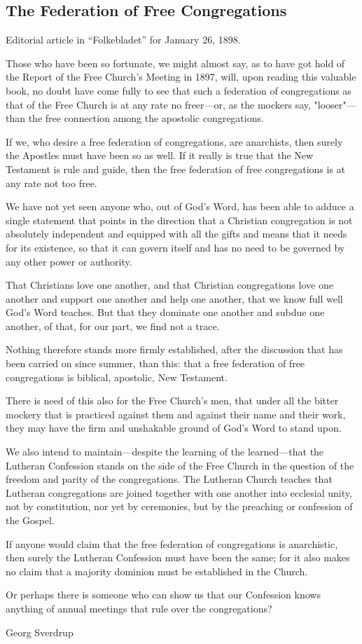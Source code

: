 
\subsection{The Federation of Free Congregations}

Editorial article in “Folkebladet” for January 26, 1898.

Those who have been so fortunate, we might almost say, as to have got hold of the Report of the Free Church’s Meeting in 1897, will, upon reading this valuable book, no doubt have come fully to see that such a federation of congregations as that of the Free Church is at any rate no freer—or, as the mockers say, "looser"—than the free connection among the apostolic congregations.

If we, who desire a free federation of congregations, are anarchists, then surely the Apostles must have been so as well. If it really is true that the New Testament is rule and guide, then the free federation of free congregations is at any rate not too free.

We have not yet seen anyone who, out of God’s Word, has been able to adduce a single statement that points in the direction that a Christian congregation is not absolutely independent and equipped with all the gifts and means that it needs for its existence, so that it can govern itself and has no need to be governed by any other power or authority.

That Christians love one another, and that Christian congregations love one another and support one another and help one another, that we know full well God’s Word teaches. But that they dominate one another and subdue one another, of that, for our part, we find not a trace.

Nothing therefore stands more firmly established, after the discussion that has been carried on since summer, than this: that a free federation of free congregations is biblical, apostolic, New Testament.

There is need of this also for the Free Church’s men, that under all the bitter mockery that is practiced against them and against their name and their work, they may have the firm and unshakable ground of God’s Word to stand upon.

We also intend to maintain—despite the learning of the learned—that the Lutheran Confession stands on the side of the Free Church in the question of the freedom and parity of the congregations. The Lutheran Church teaches that Lutheran congregations are joined together with one another into ecclesial unity, not by constitution, nor yet by ceremonies, but by the preaching or confession of the Gospel.

If anyone would claim that the free federation of congregations is anarchistic, then surely the Lutheran Confession must have been the same; for it also makes no claim that a majority dominion must be established in the Church.

Or perhaps there is someone who can show us that our Confession knows anything of annual meetings that rule over the congregations?

Georg Sverdrup
